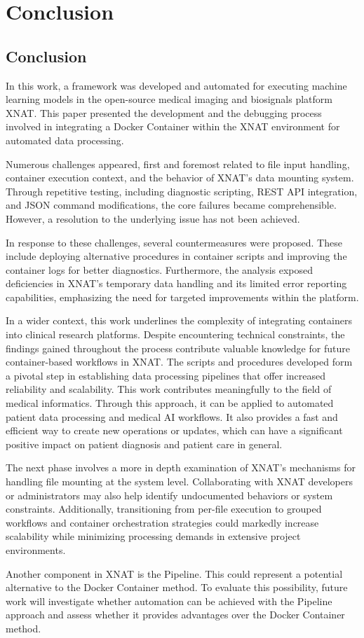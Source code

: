 

\chapter{Conclusion}

\section{Conclusion}
In this work, a framework was developed and automated for executing machine learning models in the open-source medical imaging and biosignals platform XNAT. This paper presented the development and the debugging process involved in integrating a Docker Container within the XNAT environment for automated data processing.

Numerous challenges appeared, first and foremost related to file input handling, container execution context, and the behavior of XNAT's data mounting system. Through repetitive testing, including diagnostic scripting, REST API integration, and JSON command modifications, the core failures became comprehensible. However, a resolution to the underlying issue has not been achieved.

In response to these challenges, several countermeasures were proposed. These include deploying alternative procedures in container scripts and improving the container logs for better diagnostics. Furthermore, the analysis exposed deficiencies in XNAT’s temporary data handling and its limited error reporting capabilities, emphasizing the need for targeted improvements within the platform.

In a wider context, this work underlines the complexity of integrating containers into clinical research platforms. Despite encountering technical constraints, the findings gained throughout the process contribute valuable knowledge for future container-based workflows in XNAT. The scripts and procedures developed form a pivotal step in establishing data processing pipelines that offer increased reliability and scalability. This work contributes meaningfully to the field of medical informatics. Through this approach, it can be applied to automated patient data processing and medical AI workflows. It also provides a fast and efficient way to create new operations or updates, which can have a significant positive impact on patient diagnosis and patient care in general.

The next phase involves a more in depth examination of XNAT's mechanisms for handling file mounting at the system level. Collaborating with XNAT developers or administrators may also help identify undocumented behaviors or system constraints. Additionally,  transitioning from per-file execution to grouped workflows and container orchestration strategies could markedly increase scalability while minimizing processing demands in extensive project environments. 

Another component in XNAT is the Pipeline. This could represent a potential alternative to the Docker Container method. To evaluate this possibility, future work will investigate whether automation can be achieved with the Pipeline approach and assess whether it provides advantages over the Docker Container method.

